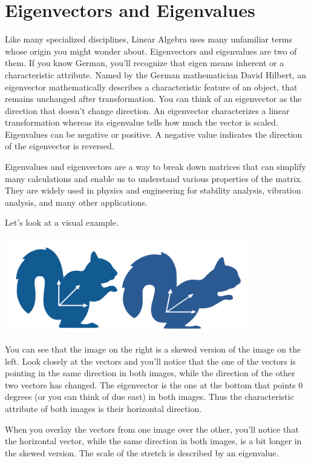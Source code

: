 \chapter{Eigenvectors and Eigenvalues}


Like many specialized disciplines, Linear Algebra uses many unfamiliar terms whose origin you might wonder about. Eigenvectors and eigenvalues are two of them. If you know German, you’ll recognize that eigen means inherent or a characteristic attribute. Named by the German mathematician David Hilbert, an eigenvector mathematically describes a characteristic feature of an object, that remains unchanged after transformation. You can think of an eigenvector as the direction that doesn’t change direction. An eigenvector characterizes a linear transformation whereas its eigenvalue tells how much the vector is scaled. Eigenvalues can be negative or positive. A negative value indicates the direction of the eigenvector is reversed.

Eigenvalues and eigenvectors are a way to break down matrices that can simplify many calculations and enable us to understand various properties of the matrix. They are widely used in physics and engineering for stability analysis, vibration analysis, and many other applications.  

Let’s look at a visual example.

\includegraphics[width=0.8\textwidth]{eigensquirrel.png}

You can see that the  image on the right is a skewed version of the image on the left. Look closely at the vectors and you’ll notice that the one of the vectors is pointing in the same direction in both images, while the direction of the other two vectors has changed. The eigenvector is the one at the bottom that points 0 degrees (or you can think of due east) in both images. Thus the characteristic attribute of both images is their horizontal direction.

When you overlay the vectors from one image over the other, you’ll notice that the horizontal vector, while the same direction in both images, is a bit longer in the skewed version. The scale of the stretch is described by an eigenvalue.

